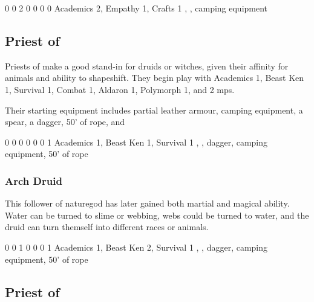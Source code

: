 {\begin{multicols}{2}

{0}%
{0}%
{{2}%
{0}%
{0}}%
{0}%
{0}%
{Academics 2, Empathy 1, Crafts 1}%
{\Dagger, \completeleather, camping equipment}%
{}

\subsection{Priest of }

Priests of  make a good stand-in for druids or witches, given their affinity for animals and ability to shapeshift.
They begin play with Academics 1, Beast Ken 1, Survival 1, Combat 1, Aldaron 1, Polymorph 1, and 2 \glspl{mp}.

Their starting equipment includes partial leather armour, camping equipment, a spear, a dagger, 50' of rope, and 


{0}%
{0}%
{{0}%
{0}%
{0}}%
{0}%
{1}%
{Academics 1, Beast Ken 1, Survival 1}%
{\spear, \partialleather, dagger, camping equipment, 50' of rope}%
{}

\subsubsection{Arch Druid}

This follower of \gls{naturegod} has later gained both martial and magical ability.
Water can be turned to slime or webbing, webs could be turned to water, and the druid can turn themself into different races or animals.


{0}%
{0}%
{{1}%
{0}%
{0}}%
{0}%
{1}%
{Academics 1, Beast Ken 2, Survival 1}%
{\partialleather, \spear, dagger, camping equipment, 50' of rope}%
{}

\subsection{Priest of }


\end{multicols}}
